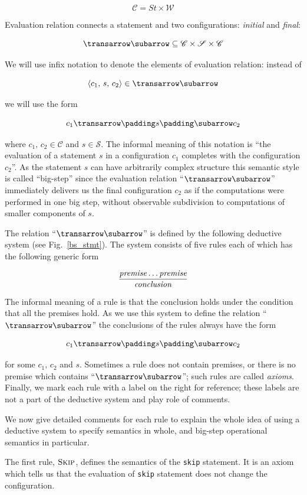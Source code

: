 \[
\mathscr{C} = St \times \mathscr W
\]

Evaluation relation connects a statement and two configurations: \emph{initial} and \emph{final}:

\[
\transrel\subseteq \mathscr{C}\times\mathscr{S}\times\mathscr{C}
\]

We will use infix notation to denote the elements of evaluation relation: instead of 

\[
\inbr{c_1,\,s,\,c_2}\in\transrel
\]

we will use the form


\[
\trans{c_1}{s}{c_2}
\]


where $c_1,\,c_2\in\mathscr{C}$ and $s\in\mathscr{S}$. The informal meaning of this notation is
``the evaluation of a statement $s$ in a configuration $c_1$ completes with the configuration $c_2$''. As the
statement $s$ can have arbitrarily complex structure this semantic style is called ``big-step'' since
the evaluation relation ``$\transrel$'' immediately delivers us the final configuration $c_2$ as if
the computations were performed in one big step, without observable subdivision to computations
of smaller components of $s$.

The relation ``$\transrel$'' is defined by the following deductive system (see Fig.~\ref{bs_stmt}). The system
consists of five rules each of which has the following generic form

\[
\dfrac{\mbox{\emph{premise}}\dots\mbox{\emph{premise}}}{\mbox{\emph{conclusion}}}
\]

The informal meaning of a rule is that the conclusion holds under the condition that all the premises hold. As
we use this system to define the relation ``$\transrel$'' the conclusions of the rules always have
the form

\[
\trans{c_1}{s}{c_2}
\]

for some $c_1,\,c_2$ and $s$. Sometimes a rule does not contain premises, or there is no premise which
contains ``$\transrel$''; such rules are called \emph{axioms}. Finally, we mark each rule with
a label on the right for reference; these labels are not a part of the deductive system and play
role of comments.

We now give detailed comments for each rule to explain the whole idea of using a deductive system to
specify semantics in whole, and big-step operational semantics in particular.

The first rule, $\textsc{Skip}$, defines the semantics of the \lstinline|skip| statement. It is an
axiom which tells us that the evaluation of \lstinline|skip| statement does not change the configuration.

